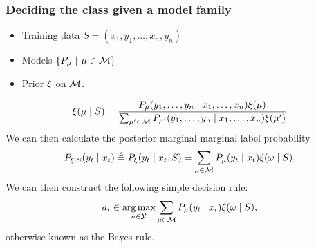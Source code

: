 \begin{frame}
  \frametitle{Deciding the class given a model family}
  \begin{itemize}
  \item Training data $S = (x_1, y_1, \ldots, x_n, y_n)$
  \item Models $\left\{P_\mu ~\middle|~ \mu \in {\mathcal{M}}\right\}$
  \item Prior $\xi$ on ${\mathcal{M}}$.
  \end{itemize}
  \[
    \xi(\mu \mid S)
    = \frac{P_\mu(y_1, \ldots, y_n \mid x_1, \ldots, x_n) \xi(\mu)}
    {\sum_{\mu' \in {\mathcal{M}}} P_{\mu'}(y_1, \ldots, y_n \mid x_1, \ldots, x_n) \xi(\mu')}
  \]
  We can then calculate the posterior marginal marginal label probability
  \[
    P_{\xi \mid S}(y_t \mid x_t) \mathrel{\triangleq}
    P_{\xi}(y_t \mid x_t, S) = 
    \sum_{\mu \in {\mathcal{M}}} P_\mu(y_t \mid x_t) \xi(\omega \mid S).
  \]
  We can then construct the following simple decision rule:
  \[
    a_t \in \mathop{\rm arg\,max}_{a \in {\mathcal{Y}}}\sum_{\mu \in {\mathcal{M}}} P_\mu(y_t \mid x_t) \xi(\omega \mid S),
  \]
  otherwise known as the \alert{Bayes rule}.
\end{frame}







